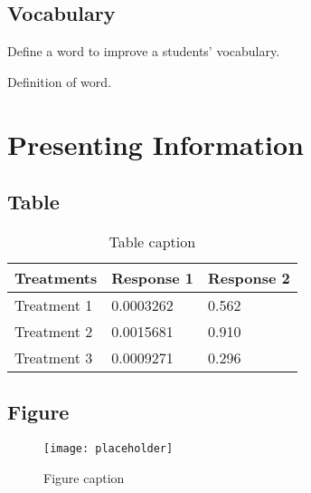 \documentclass[11pt,fleqn]{book} %
\begin{document}

\section{Vocabulary}

Define a word to improve a students' vocabulary.

\begin{vocabulary}[Word]
Definition of word.
\end{vocabulary}



\chapter{Presenting Information}

\section{Table}

\begin{table}[h]
\centering
\begin{tabular}{l l l}
\toprule
\textbf{Treatments} & \textbf{Response 1} & \textbf{Response 2}\\
\midrule
Treatment 1 & 0.0003262 & 0.562 \\
Treatment 2 & 0.0015681 & 0.910 \\
Treatment 3 & 0.0009271 & 0.296 \\
\bottomrule
\end{tabular}
\caption{Table caption}
\end{table}


\section{Figure}

\begin{figure}[h]
\centering\texttt{[image: placeholder]}
\caption{Figure caption}
\end{figure}
\end{document}
